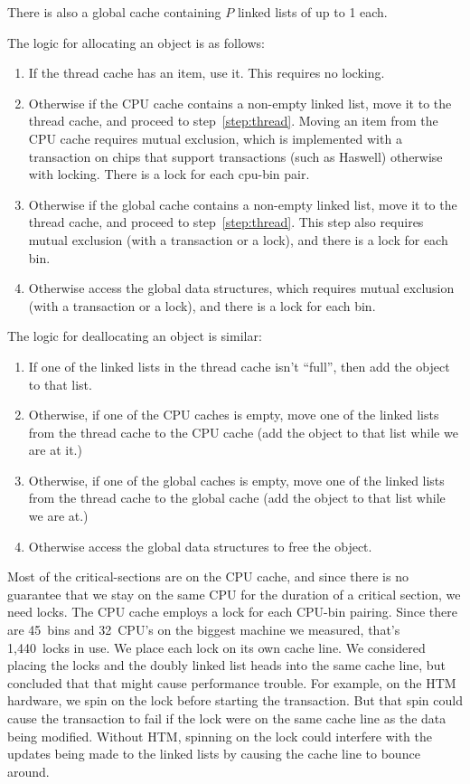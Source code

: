 \documentclass[pldi]{sigplanconf-pldi15}
\begin{document}
There is also a global cache containing $P$ linked lists of up to
\unit{1}\mebi\byte{} each. 

The logic for allocating an object is as follows:
\begin{enumerate}
\item If the thread cache has an item, use it.  This requires no
  locking. \label{step:thread}
\item Otherwise if the CPU cache contains a non-empty linked list,
  move it to the thread cache, and proceed to step~\ref{step:thread}.
  Moving an item from the CPU cache requires mutual exclusion, which
  is implemented with a transaction on chips that support transactions
  (such as Haswell) otherwise with locking. There is a lock for each
  cpu-bin pair.\label{step:cpu}
\item Otherwise if the global cache contains a non-empty linked list,
  move it to the thread cache, and proceed to step~\ref{step:thread}.
  This step also requires mutual exclusion (with a transaction or a
  lock), and there is a lock for each bin.
\item Otherwise access the global data structures, which requires
  mutual exclusion (with a transaction or a lock), and there is a lock
  for each bin.
\end{enumerate}

The logic for deallocating an object is similar:
\begin{enumerate}
\item If one of the linked lists in the thread cache isn't ``full'',
  then add the object to that list.
\item Otherwise, if one of the CPU caches is empty, move one of the
  linked lists from the thread cache to the CPU cache (add the object
  to that list while we are at it.)
\item Otherwise, if one of the global caches is empty, move one of the
  linked lists from the thread cache to the global cache (add the
  object to that list while we are at.)
\item Otherwise access the global data structures to free the object.
\end{enumerate}

Most of the critical-sections are on the CPU cache, and since there is
no guarantee that we stay on the same CPU for the duration of a
critical section, we need locks.  The CPU cache employs a lock for
each CPU-bin pairing.  Since there are 45~bins and 32~CPU's on the
biggest machine we measured, that's 1,440~locks in use.  We place each
lock on its own cache line.  We considered placing the locks and the
doubly linked list heads into the same cache line, but concluded that
that might cause performance trouble.  For example, on the HTM
hardware, we spin on the lock before starting the transaction.  But
that spin could cause the transaction to fail if the lock were on the
same cache line as the data being modified.  Without HTM, spinning on
the lock could interfere with the updates being made to the linked
lists by causing the cache line to bounce around.
\end{document}
